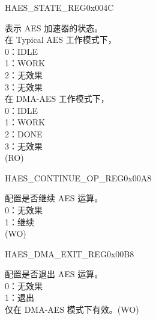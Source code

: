 \begin{register}{H}{AES\_STATE\_REG}{0x004C}\label{regdesc:AESSTATEREG}
%
%
\regnewline%
\begin{regdesc}\begin{reglist}
\item [AES\_STATE] 表示 AES 加速器的状态。\\
在 Typical AES 工作模式下，\\
0：IDLE \\
1：WORK\\
2：无效果\\
3：无效果\\
在 DMA-AES 工作模式下，\\
0：IDLE\\
1：WORK\\
2：DONE\\
3：无效果\\
(RO)
\end{reglist}\end{regdesc}
\end{register}


\begin{register}{H}{AES\_CONTINUE\_OP\_REG}{0x00A8}\label{regdesc:AESCONTINUEOPREG}
%
%
\regnewline%
\begin{regdesc}\begin{reglist}
\item [AES\_CONTINUE\_OP] 配置是否继续 AES 运算。\\
0：无效果\\
1：继续 \\ (WO)
\end{reglist}\end{regdesc}
\end{register}


\begin{register}{H}{AES\_DMA\_EXIT\_REG}{0x00B8}\label{regdesc:AESDMAEXITREG}
%
%
\regnewline%
\begin{regdesc}\begin{reglist}
\item [AES\_DMA\_EXIT] 配置是否退出 AES 运算。\\
0：无效果\\
1：退出\\
仅在 DMA-AES 模式下有效。(WO)
\end{reglist}\end{regdesc}
\end{register}


